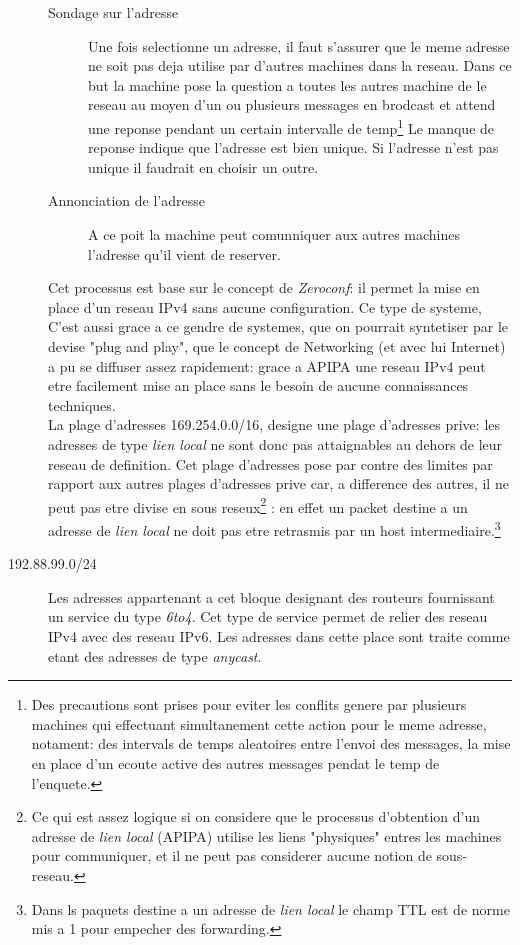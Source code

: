 \begin{description}
\begin{description}
\item[Sondage sur l'adresse]
Une fois selectionne un adresse, il faut s'assurer que le meme adresse ne soit
pas deja utilise par d'autres machines dans la reseau. Dans ce but la machine
pose la question a toutes les autres machine de le reseau au moyen d'un ou plusieurs messages
en brodcast et attend une reponse pendant un certain intervalle de temp\footnote{
Des precautions sont prises pour eviter les conflits genere par plusieurs
machines qui effectuant simultanement cette action pour le meme adresse,
notament: des intervals de temps aleatoires entre l'envoi des messages, la mise
en place d'un ecoute active des autres messages pendat le temp de l'enquete.}
Le manque de reponse indique que l'adresse est bien unique. Si l'adresse n'est
pas unique il faudrait en choisir un outre.

\item[Annonciation de l'adresse]
A ce poit la machine peut comunniquer aux autres machines l'adresse qu'il
vient de reserver.

\end{description}



Cet processus est base sur le concept de {\it Zeroconf}: il permet la mise en
place d'un reseau IPv4 sans aucune configuration. Ce type de systeme,
C'est aussi grace a ce gendre de systemes, que on 
pourrait syntetiser par le devise %
"plug and play", que le concept de Networking (et avec lui Internet) a pu se
diffuser assez rapidement: grace a APIPA une reseau IPv4 peut etre facilement
mise an place sans le besoin de aucune connaissances techniques.\\

La plage d'adresses 169.254.0.0/16, designe une plage d'adresses prive: les
adresses de type {\it lien local} ne sont donc pas attaignables au dehors de
leur reseau de definition. 
Cet plage d'adresses pose  par contre des limites par rapport aux autres
plages d'adresses prive car, a difference des autres, il ne peut pas etre
divise en sous reseux\footnote{Ce qui est assez logique si on considere que
le processus d'obtention d'un adresse de {\it lien local} (APIPA) utilise
les liens "physiques" entres les machines pour communiquer, et il ne peut
pas considerer aucune notion de sous-reseau.}
: en effet un packet destine a un adresse de {\it lien local} ne doit pas etre
retrasmis par un host intermediaire.\footnote{Dans ls paquets destine
a un adresse de {\it lien local} le champ TTL est de norme mis a 1
pour empecher des forwarding.}

\item[192.88.99.0/24]
Les adresses appartenant a cet bloque designant des routeurs 
fournissant un service du type {\it 6to4}. Cet type de service
permet de relier des reseau IPv4 avec des reseau IPv6.
Les adresses dans cette place sont traite comme etant des adresses
de type {\it anycast}.


\end{description}




